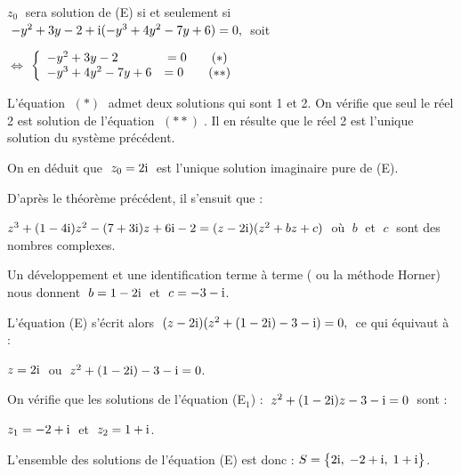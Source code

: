   $z_0\; $ sera solution de (E) si et seulement si $\; -y^2+3 y-2+\text{i}(- y^3 + 4 y^2-7 y+ 6)=0,\; $ soit
  
    $ \Longleftrightarrow  $ 
 $\left\{\begin{array}{l c}
 -y^2+3 y-2& =0\qquad (\ast) \\ 	 
 - y^3 + 4 y^2-7 y+ 6& = 0\qquad (\ast\ast)
\end{array}\right.$ 


L'équation $ \;(\ast)\; $ admet deux solutions qui sont 1 et 2. On vérifie que seul le réel 2 est solution
de l’équation $ \;(\ast\ast)\; $. Il en résulte que le réel 2 est l'unique solution du système précédent.

\medskip
On en déduit que  $\; z_0 = 2\text{i} \;$ est l'unique solution imaginaire pure de (E).


\medskip
D'après le théorème précédent, il s'ensuit que :


\medskip

$ z^3 + ( 1-4\text{i} )z^2 -( 7+ 3\text{i} ) z+ 6\text{i}-2=(z-2 \text{i})(z^2+ b z+ c) \;$  où $\; b\; $ et $\; c \;$ sont des nombres complexes.


\medskip

Un développement et une identification  terme à terme ( ou  la méthode Horner) nous donnent   $\; b = 1-2\text{i} \;$ et $\; c = -3-\text{i}$.


\medskip
L'équation (E) s'écrit alors $\; ( z-2\text{i} ) ( z^2 + ( 1-2\text{i} )-3-\text{i} ) =0, \;$  ce qui équivaut à :

\medskip
$z = 2\text{i}\; $ ou  $\; z^2 + ( 1-2\text{i} )-3-\text{i}=0$.


\medskip
On vérifie que les solutions de l'équation (E$_1$) : $\; z^2 + ( 1-2\text{i} )z-3-\text{i}=0\; $ sont :

\medskip
$z_1 = -2+\text{i}\; $  et $\; z_2 = 1+\text{i}$.

\medskip

L'ensemble des solutions de l'équation (E) est donc : $S = \bigl\{ 2\text{i}, \; -2+\text{i},\;  1+\text{i} \bigr\}$.


 
